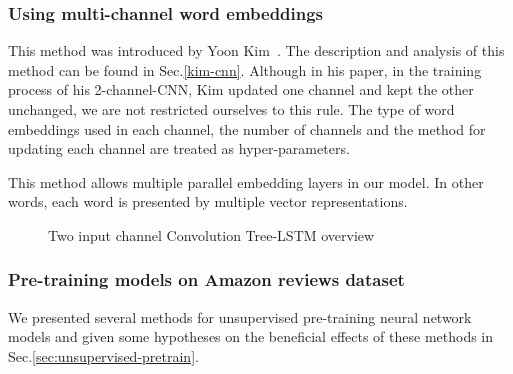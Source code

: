 \subsubsection{Using multi-channel word embeddings}\label{sec:enhan-multi-channel}
This method was introduced by Yoon Kim~\cite{KimCNN}.
The description and analysis of this method can be found in Sec.\ref{kim-cnn}.
Although in his paper, in the training process of his 2-channel-CNN, Kim updated one channel and kept the other unchanged, we are not restricted ourselves to this rule.
The type of word embeddings used in each channel, the number of channels and the method for updating each channel are treated as hyper-parameters.

This method allows multiple parallel embedding layers in our model.
In other words, each word is presented by multiple vector representations.

\begin{figure}[H]
    \centering
    \caption[Convolution Tree-LSTM overview]{Two input channel Convolution Tree-LSTM overview}
    \label{fig:multichannelcnnlstm}
\end{figure}


\subsubsection{Pre-training models on Amazon reviews dataset}
\label{enhan-unsupervised-pretrain}
We presented several methods for unsupervised pre-training neural network models and given some hypotheses on the beneficial effects of these methods in Sec.\ref{sec:unsupervised-pretrain}.
